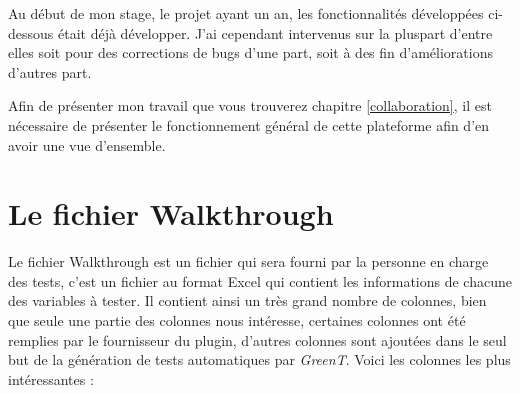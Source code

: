 Au début de mon stage, le projet ayant un an, les fonctionnalités développées ci-dessous était déjà développer. J'ai cependant intervenus
sur la pluspart d'entre elles soit pour des corrections de bugs d'une part, soit à des fin d'améliorations d'autres part.

Afin de présenter mon travail que vous trouverez chapitre \ref{collaboration}, il est nécessaire de présenter le fonctionnement général de
cette plateforme afin d'en avoir une vue d'ensemble.

	\section{Le fichier Walkthrough}\label{wt}
		Le fichier Walkthrough est un fichier qui sera fourni par la personne en charge des tests, c'est un fichier au format Excel qui contient les informations
		de chacune des variables à tester. Il contient ainsi un très grand nombre de colonnes, bien que seule une partie des colonnes nous
		intéresse, certaines colonnes ont été remplies par le fournisseur du plugin, d'autres colonnes sont ajoutées dans le seul but de la
		génération de tests automatiques par \textit{GreenT}. Voici les colonnes les plus intéressantes : 


